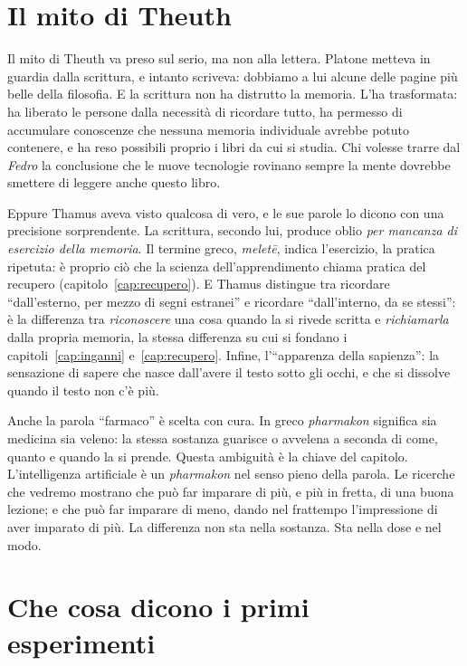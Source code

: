 \section{Il mito di Theuth}

Il mito di Theuth va preso sul serio, ma non alla lettera. Platone
metteva in guardia dalla scrittura, e intanto scriveva: dobbiamo a lui
alcune delle pagine più belle della filosofia. E la scrittura non ha
distrutto la memoria. L'ha trasformata: ha liberato le persone dalla
necessità di ricordare tutto, ha permesso di accumulare conoscenze che
nessuna memoria individuale avrebbe potuto contenere, e ha reso
possibili proprio i libri da cui si studia. Chi volesse trarre dal
\emph{Fedro} la conclusione che le nuove tecnologie rovinano sempre la
mente dovrebbe smettere di leggere anche questo libro.

Eppure Thamus aveva visto qualcosa di vero, e le sue parole lo dicono
con una precisione sorprendente. La scrittura, secondo lui, produce
oblio \emph{per mancanza di esercizio della memoria}. Il termine greco,
\emph{meletē}, indica l'esercizio, la pratica ripetuta: è proprio ciò
che la scienza dell'apprendimento chiama pratica del recupero
(capitolo~\ref{cap:recupero}). E Thamus distingue tra ricordare
\enquote{dall'esterno, per mezzo di segni estranei} e ricordare
\enquote{dall'interno, da se stessi}: è la differenza tra
\emph{riconoscere} una cosa quando la si rivede scritta e
\emph{richiamarla} dalla propria memoria, la stessa differenza su cui
si fondano i capitoli~\ref{cap:inganni} e~\ref{cap:recupero}. Infine,
l'\enquote{apparenza della sapienza}: la sensazione di sapere che nasce
dall'avere il testo sotto gli occhi, e che si dissolve quando il testo
non c'è più.

Anche la parola \enquote{farmaco} è scelta con cura. In greco
\emph{pharmakon} significa sia medicina sia veleno: la stessa sostanza
guarisce o avvelena a seconda di come, quanto e quando la si prende.
Questa ambiguità è la chiave del capitolo. L'intelligenza artificiale è
un \emph{pharmakon} nel senso pieno della parola. Le ricerche che
vedremo mostrano che può far imparare di più, e più in fretta, di una
buona lezione; e che può far imparare di meno, dando nel frattempo
l'impressione di aver imparato di più. La differenza non sta nella
sostanza. Sta nella dose e nel modo.

\section{Che cosa dicono i primi esperimenti}


